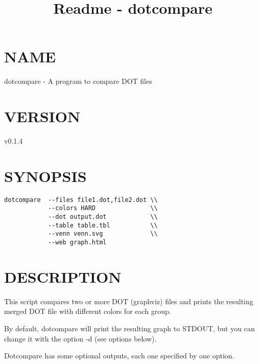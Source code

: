\documentclass[10pt]{article}
\title{Readme - dotcompare}
\author{}
\date{}
\begin{document}
\maketitle


\section{NAME}\label{name}

dotcompare - A program to compare DOT files

\section{VERSION}\label{version}

v0.1.4

\section{SYNOPSIS}\label{synopsis}

\begin{verbatim}
dotcompare  --files file1.dot,file2.dot \\  
            --colors HARD               \\   
            --dot output.dot            \\   
            --table table.tbl           \\ 
            --venn venn.svg             \\ 
            --web graph.html               
\end{verbatim}

\section{DESCRIPTION}\label{description}

This script compares two or more DOT (graphviz) files and prints the
resulting merged DOT file with different colors for each group.

By default, dotcompare will print the resulting graph to STDOUT, but you
can change it with the option -d (see options below).

Dotcompare has some optional outputs, each one specified by one option.
\end{document}
